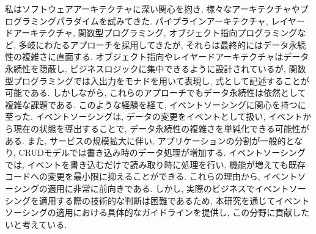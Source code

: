 \documentclass[../../main]{subfiles}
\begin{document}
    私はソフトウェアアーキテクチャに深い関心を抱き, 様々なアーキテクチャやプログラミングパラダイムを試みてきた. パイプラインアーキテクチャ, レイヤードアーキテクチャ, 関数型プログラミング, オブジェクト指向プログラミングなど, 多岐にわたるアプローチを採用してきたが, それらは最終的にはデータ永続性の複雑さに直面する. オブジェクト指向やレイヤードアーキテクチャはデータ永続性を隠蔽し, ビジネスロジックに集中できるように設計されているが, 関数型プログラミングでは入出力をモナドを用いて表現し, 式として記述することが可能である. しかしながら, これらのアプローチでもデータ永続性は依然として複雑な課題である. このような経験を経て, イベントソーシングに関心を持つに至った. イベントソーシングは, データの変更をイベントとして扱い, イベントから現在の状態を導出することで, データ永続性の複雑さを単純化できる可能性がある. また, サービスの規模拡大に伴い, アプリケーションの分割が一般的となり, CRUDモデルでは書き込み時のデータ処理が増加する. イベントソーシングでは, イベントを書き込むだけで読み取り時に処理を行い, 機能が増えても既存コードへの変更を最小限に抑えることができる. これらの理由から, イベントソーシングの適用に非常に前向きである. しかし, 実際のビジネスでイベントソーシングを適用する際の技術的な判断は困難であるため, 本研究を通じてイベントソーシングの適用における具体的なガイドラインを提供し, この分野に貢献したいと考えている.

    \clearpage
\end{document}
